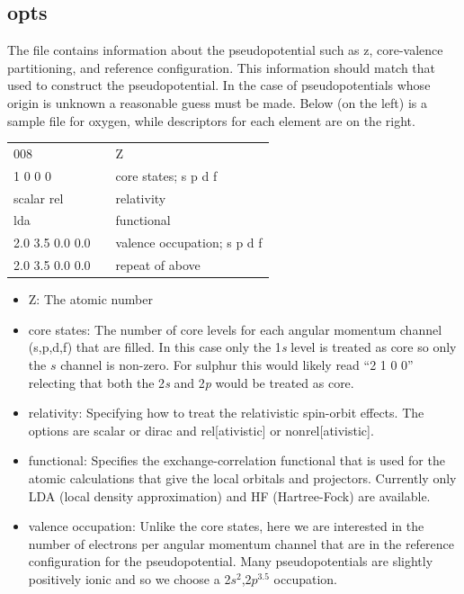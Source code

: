 \documentclass[11pt]{report}
\begin{document}
\subsection{opts}
\label{opts}
The  file contains information about the pseudopotential such as z, core-valence partitioning, and reference configuration. This information should match that used to construct the pseudopotential. In the case of pseudopotentials 
whose origin is unknown a reasonable guess must be made. Below (on the left) is a sample  file for oxygen, while descriptors for each element are on the right.

\begin{center}
\begin{tabular}{| l | c l |}
\hline
008				& &  Z\\
1 0 0 0			& & core states; s p d f \\
scalar rel			& & relativity \\
lda				& & functional \\
2.0 3.5 0.0 0.0		& & valence occupation; s p d f \\
2.0 3.5 0.0 0.0		& & repeat of above \\
\hline
\end{tabular}
\end{center}

\begin{itemize}
\item Z: The atomic number
\item core states: The number of core levels for each angular momentum channel (s,p,d,f) that are filled. In this case only the 1{\it s} level is treated as core so only the $s$ channel is non-zero. For sulphur this would likely read ``2 1 0 0'' relecting that both the 2{\it s} and 2{\it p} would be treated as core.
\item relativity: Specifying how to treat the relativistic spin-orbit effects. The options are scalar or dirac and rel[ativistic] or nonrel[ativistic].
\item functional: Specifies the exchange-correlation functional that is used for the atomic calculations that give the local orbitals and projectors. Currently only LDA (local density approximation) and HF (Hartree-Fock) are available.
\item valence occupation: Unlike the core states, here we are interested in the number of electrons per angular momentum channel that are in the reference configuration for the pseudopotential. Many pseudopotentials are slightly positively ionic and so we choose a 2$s^2$,2$p^{3.5}$ occupation. 
\end{itemize}
\end{document}
